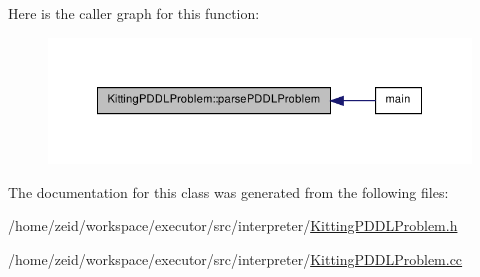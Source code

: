 Here is the caller graph for this function:\nopagebreak
\begin{figure}[H]
\begin{center}
\leavevmode
\includegraphics[width=342pt]{class_kitting_p_d_d_l_problem_ab3d83970ecca959e48915bd91104769c_icgraph}
\end{center}
\end{figure}




The documentation for this class was generated from the following files:\begin{DoxyCompactItemize}
\item 
/home/zeid/workspace/executor/src/interpreter/\hyperlink{_kitting_p_d_d_l_problem_8h}{KittingPDDLProblem.h}\item 
/home/zeid/workspace/executor/src/interpreter/\hyperlink{_kitting_p_d_d_l_problem_8cc}{KittingPDDLProblem.cc}\end{DoxyCompactItemize}
